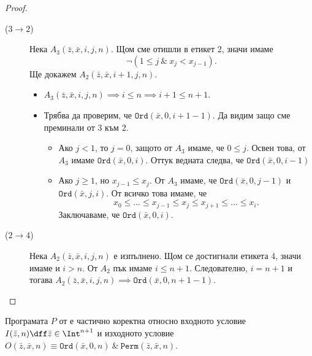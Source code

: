 \begin{proof}
\begin{description}
\item[($3\to 2$)]
  Нека $A_3(\bar{z},\bar{x},i,j,n)$.
  Щом сме отишли в етикет 2, значи имаме \[\neg(1 \leq j\ \&\ x_j < x_{j-1}).\]
  Ще докажем $A_2(\bar{z},\bar{x},i+1,j,n)$.
  \begin{itemize}
  \item 
    $A_3(\bar{z},\bar{x},i,j,n) \implies i \leq n \implies i+1 \leq n+1$.
  \item
    Трябва да проверим, че $\texttt{Ord}(\bar{x},0,i+1-1)$.
    Да видим защо сме преминали от 3 към 2.
    \begin{itemize}
    \item 
      Ако $j < 1$, то $j = 0$, защото от $A_3$ имаме, че $0\leq j$.
      Освен това, от $A_3$ имаме $\texttt{Ord}(\bar{x},0,i)$.
      Оттук ведната следва, че $\texttt{Ord}(\bar{x},0,i-1)$
    \item
      Ако $j \geq 1$, но $x_{j-1} \leq x_j$.
      От $A_3$ имаме, че $\texttt{Ord}(\bar{x},0,j-1)$ и $\texttt{Ord}(\bar{x},j,i)$.
      От всичко това имаме, че 
      \[x_0 \leq \dots \leq x_{j-1} \leq x_j \leq x_{j+1} \leq \dots \leq x_i.\]
      Заключаваме, че $\texttt{Ord}(\bar{x},0,i)$.
    \end{itemize}
  \end{itemize}
\item[($2 \to 4$)]
  Нека $A_2(\bar{z},\bar{x},i,j,n)$ е изпълнено. Щом се достигнали етикета 4, значи имаме и $i > n$.
  От $A_2$ пък имаме $i \leq n+1$.
  Следователно, $i = n+1$ и тогава $A_2(\bar{z},\bar{x},i,j,n) \implies \texttt{Ord}(\bar{x},0,n+1-1)$.
\end{description}
\end{proof}

\begin{cor}
  Програмата $P$ от  
  е частично коректна относно входното условие $I(\bar{z},n) \dff \bar{z}\in\Int^{n+1}$ и изходното условие $O(\bar{z},\bar{x},n) \equiv \texttt{Ord}(\bar{x},0,n)\ \&\ \texttt{Perm}(\bar{z},\bar{x},n)$.
\end{cor}

